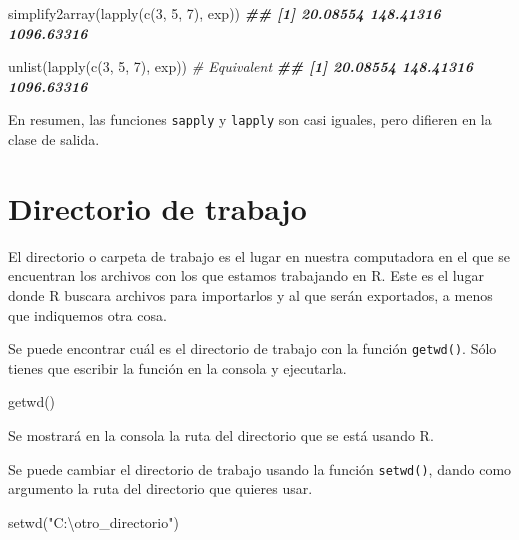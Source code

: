 \documentclass[
]{book}
\newenvironment{Shaded}{\begin{snugshade}}{\end{snugshade}}
\newcommand{\CommentTok}[1]{\textcolor[rgb]{0.56,0.35,0.01}{\textit{#1}}}
\newcommand{\DecValTok}[1]{\textcolor[rgb]{0.00,0.00,0.81}{#1}}
\newcommand{\DocumentationTok}[1]{\textcolor[rgb]{0.56,0.35,0.01}{\textbf{\textit{#1}}}}
\newcommand{\FunctionTok}[1]{\textcolor[rgb]{0.00,0.00,0.00}{#1}}
\newcommand{\NormalTok}[1]{#1}
\newcommand{\StringTok}[1]{\textcolor[rgb]{0.31,0.60,0.02}{#1}}
\begin{document}
\begin{Shaded}
\begin{Highlighting}[]
\FunctionTok{simplify2array}\NormalTok{(}\FunctionTok{lapply}\NormalTok{(}\FunctionTok{c}\NormalTok{(}\DecValTok{3}\NormalTok{, }\DecValTok{5}\NormalTok{, }\DecValTok{7}\NormalTok{), exp))}
\DocumentationTok{\#\# [1]   20.08554  148.41316 1096.63316}


\FunctionTok{unlist}\NormalTok{(}\FunctionTok{lapply}\NormalTok{(}\FunctionTok{c}\NormalTok{(}\DecValTok{3}\NormalTok{, }\DecValTok{5}\NormalTok{, }\DecValTok{7}\NormalTok{), exp)) }\CommentTok{\# Equivalent}
\DocumentationTok{\#\# [1]   20.08554  148.41316 1096.63316}
\end{Highlighting}
\end{Shaded}

En resumen, las funciones \texttt{sapply} y \texttt{lapply} son casi iguales, pero difieren en la clase de salida.

\hypertarget{directorio-de-trabajo}{%
\chapter{Directorio de trabajo}\label{directorio-de-trabajo}}

El directorio o carpeta de trabajo es el lugar en nuestra computadora en el que se encuentran los archivos con los que estamos trabajando en R. Este es el lugar donde R buscara archivos para importarlos y al que serán exportados, a menos que indiquemos otra cosa.

Se puede encontrar cuál es el directorio de trabajo con la función \texttt{getwd()}. Sólo tienes que escribir la función en la consola y ejecutarla.

\begin{Shaded}
\begin{Highlighting}[]
\FunctionTok{getwd}\NormalTok{()}
\end{Highlighting}
\end{Shaded}

Se mostrará en la consola la ruta del directorio que se está usando R.

Se puede cambiar el directorio de trabajo usando la función \texttt{setwd()}, dando como argumento la ruta del directorio que quieres usar.

\begin{Shaded}
\begin{Highlighting}[]
\FunctionTok{setwd}\NormalTok{(}\StringTok{"C:\textbackslash{}otro\_directorio"}\NormalTok{)}
\end{Highlighting}
\end{Shaded}
\end{document}

